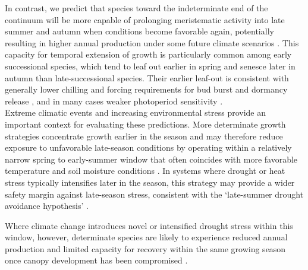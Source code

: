 \documentclass{article}
\begin{document}
In contrast, we predict that species toward the indeterminate end of the continuum will be more capable of prolonging meristematic activity into late summer and autumn when conditions become favorable again, potentially resulting in higher annual production under some future climate scenarios \citep[Figure~\ref{fig:fig_3xxx}]{caffarraEcologicalSignificancePhenology2011a, richardsonInfluenceSpringPhenology2009a, zohnerInteractiveClimateFactors2020a}. This capacity for temporal extension of growth is particularly common among early successional species, which tend to leaf out earlier in spring and senesce later in autumn than late-successional species. Their earlier leaf-out is consistent with generally lower chilling and forcing requirements for bud burst and dormancy release \citep{heideDaylengthThermalTime1993a, laubeChillingOutweighsPhotoperiod2014, huStrongerSpringPhenological2022, baumgartenChilledBeForced2021a, baslerPhotoperiodSensitivityBud2012}, and in many cases weaker photoperiod sensitivity \citep{baslerPhotoperiodSensitivityBud2012}.\\

Extreme climatic events and increasing environmental stress provide an important context for evaluating these predictions. More determinate growth strategies concentrate growth earlier in the season and may therefore reduce exposure to unfavorable late-season conditions by operating within a relatively narrow spring to early-summer window that often coincides with more favorable temperature and soil moisture conditions \citep{pearsonRelatingGrowthPhenology2022}. In systems where drought or heat stress typically intensifies later in the season, this strategy may provide a wider safety margin against late-season stress, consistent with the `late-summer drought avoidance hypothesis' \citep{pearsonRelatingGrowthPhenology2022, dorangevilleDroughtTimingLocal2018}.

Where climate change introduces novel or intensified drought stress within this window, however, determinate species are likely to experience reduced annual production and limited capacity for recovery within the same growing season once canopy development has been compromised \citep[Figure~\ref{fig:fig_3xxx}]{silvestroLongerWoodGrowing2023}.\\
\end{document}
